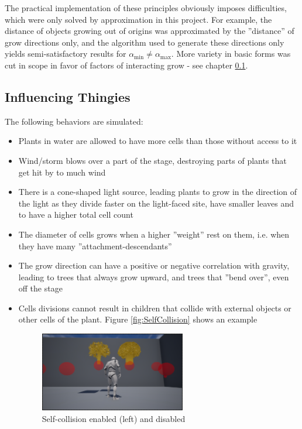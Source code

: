 \documentclass[11pt]{scrartcl}
\begin{document}
The practical implementation of these principles obviously imposes difficulties, which were only solved by approximation in this project. For example, the distance of objects growing out of origins was approximated by the ''distance'' of grow directions only, and the algorithm used to generate these directions only yields semi-satisfactory results for $\alpha_\text{min} \neq \alpha_\text{max}$. More variety in basic forms was cut in scope in favor of factors of interacting grow - see chapter \ref{cptr:Influencing}.

\subsection{Influencing Thingies} \label{cptr:Influencing}
The following behaviors are simulated:
\begin{itemize}
	\item Plants in water are allowed to have more cells than those without access to it
	\item Wind/storm blows over a part of the stage, destroying parts of plants that get hit by to much wind
	\item There is a cone-shaped light source, leading plants to grow in the direction of the light as they divide faster on the light-faced site, have smaller leaves and to have a higher total cell count
	\item The diameter of cells grows when a higher ''weight'' rest on them, i.e. when they have many ''attachment-descendants''
	\item The grow direction can have a positive or negative correlation with gravity, leading to trees that always grow upward, and trees that ''bend over'', even off the stage
	\item Cells divisions cannot result in children that collide with external objects or other cells of the plant. Figure \ref{fig:SelfCollision} shows an example
		\begin{figure} 
 		 \centering
 		    \includegraphics[width=0.6\textwidth]{SS_SelfCollision.png}
 		 \caption{Self-collision enabled (left) and disabled}

\end{figure}
\end{itemize}
\end{document}
